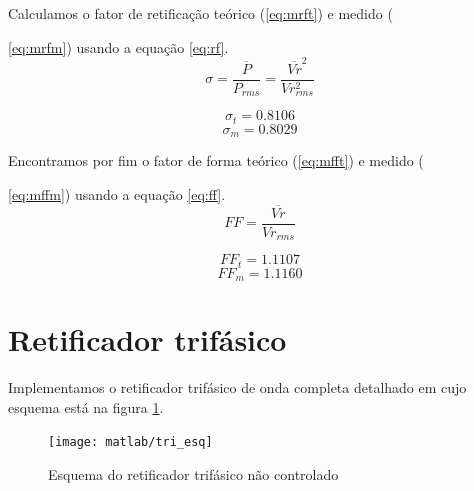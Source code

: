 \documentclass{report}
\begin{document}
Calculamos o fator de retificação teórico (\ref{eq:mrft}) e medido ({\ref{eq:mrfm}) usando a equação \ref{eq:rf}.
\begin{equation}
	\sigma = \frac{\overline{P}}{P_{rms}} = \frac{\overline{Vr}^2}{Vr_{rms}^2}
	\label{eq:rf}
\end{equation}

\begin{equation}
	\sigma_t = 0.8106
	\label{eq:mrft}
\end{equation}
\begin{equation}
	\sigma_m = 0.8029
	\label{eq:mrfm}
\end{equation}

Encontramos por fim o fator de forma teórico (\ref{eq:mfft}) e medido ({\ref{eq:mffm}) usando a equação \ref{eq:ff}.
\begin{equation}
FF = \frac{\overline{Vr}}{Vr_{rms}}
\label{eq:ff}
\end{equation}

\begin{equation}
FF_t = 1.1107
\label{eq:mfft}
\end{equation}
\begin{equation}
FF_m = 1.1160
\label{eq:mffm}
\end{equation}
\section{Retificador trifásico}
Implementamos o retificador trifásico de onda completa detalhado em \cite{bb:rexp1} cujo esquema está na figura \ref{fig:tesq}.
\begin{figure}[H]
	\centering
	\texttt{[image: matlab/tri\_esq]}
	\caption{Esquema do retificador trifásico não controlado}
	\label{fig:tesq}
\end{figure}

}}
\end{document}
